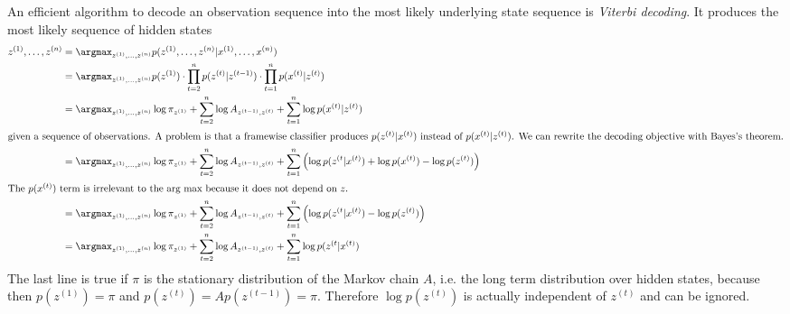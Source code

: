 An efficient algorithm to decode an observation sequence into the most likely
underlying state sequence is \emph{Viterbi decoding}. It produces the most
likely sequence of hidden states
\begin{align*}
  z^{(1)}, \dots, z^{(n)} & = \argmax_{z^{(1)}, \dots, z^{(n)}} p(z^{(1)}, \dots, z^{(n)} | x^{(1)}, \dots, x^{(n)})\\
                          & = \argmax_{z^{(1)}, \dots, z^{(n)}} p(z^{(1)}) \cdot \prod_{t = 2}^{n} p(z^{(t)} | z^{(t - 1)}) \cdot \prod_{t = 1}^{n} p(x^{(t)} | z^{(t)})\\
                          & = \argmax_{z^{(1)}, \dots, z^{(n)}} \log \pi_{z^{(1)}} + \sum_{t = 2}^{n} \log A_{z^{(t - 1)}, z^{(t)}} + \sum_{t = 1}^{n} \log p(x^{(t)} | z^{(t)})\\
  \intertext{given a sequence of observations. A problem is that a framewise classifier
produces $p(z^{(t)} | x^{(t)})$ instead of $p(x^{(t)} | z^{(t)})$. We can
rewrite the decoding objective with Bayes's theorem.}
                          & = \argmax_{z^{(1)}, \dots, z^{(n)}} \log \pi_{z^{(1)}} + \sum_{t = 2}^{n} \log A_{z^{(t - 1)}, z^{(t)}} + \sum_{t = 1}^{n} \left( \log p(z^{(t} | x^{(t)}) + \log p(x^{(t)}) - \log p(z^{(t)}) \right)\\
  \intertext{The $p(x^{(t)})$ term is irrelevant to the arg max because it does not depend on $z$.}
                          & = \argmax_{z^{(1)}, \dots, z^{(n)}} \log \pi_{z^{(1)}} + \sum_{t = 2}^{n} \log A_{z^{(t - 1)}, z^{(t)}} + \sum_{t = 1}^{n} \left( \log p(z^{(t} | x^{(t)}) - \log p(z^{(t)}) \right)\\
                          & = \argmax_{z^{(1)}, \dots, z^{(n)}} \log \pi_{z^{(1)}} + \sum_{t = 2}^{n} \log A_{z^{(t - 1)}, z^{(t)}} + \sum_{t = 1}^{n} \log p(z^{(t} | x^{(t)})
\end{align*}
The last line is true if $\pi$ is the stationary distribution of the Markov
chain $A$, i.e. the long term distribution over hidden states, because then
$p(z^{(1)}) = \pi$ and $p(z^{(t)}) = Ap(z^{(t - 1)}) = \pi$. Therefore $\log
p(z^{(t)})$ is actually independent of $z^{(t)}$ and can be ignored.

